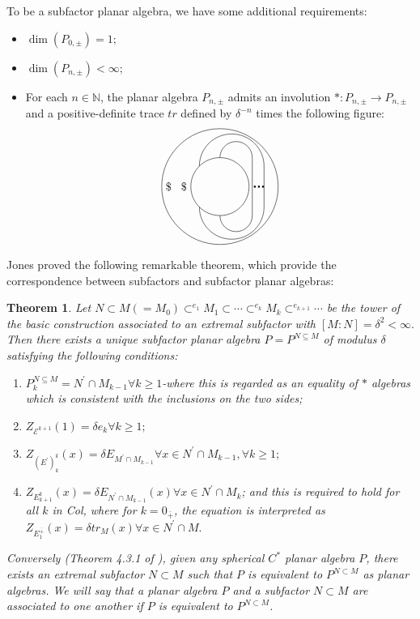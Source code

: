 \documentclass[11pt,letterpaper]{amsart}
\newtheorem{theorem}{Theorem}[section]
\theoremstyle{definition}
\theoremstyle{remark}
\def\ss{\subset}
\begin{document}
To be a subfactor planar algebra, we have some additional requirements:
\begin{itemize}
	\item $\dim(P_{0,\pm})=1;$
	\item $\dim(P_{n,\pm})<\infty$;
	\item For each $n\in\mathbb{N}$, the planar algebra $P_{n,\pm}$ admits an involution $*:P_{n,\pm}\rightarrow P_{n,\pm}$ and a positive-definite trace $tr$ defined by ${\delta}^{-n}$ times the following figure:
	\begin{equation*}
	\begin{tikzpicture}
	\draw (0,0) circle [radius=1.8];
	\draw (0,0) circle [radius=.9];
	\draw (-.707*.9,.707*.9) arc [radius=1, start angle=180, end angle=0];
	\draw (-.707*.9+2,.707*.9)--(-.707*.9+2,-.707*.9);
	\draw (-.707*.9,-.707*.9) arc [radius=1, start angle=-180, end angle=0];
	\draw (0,.9) arc [radius=.5, start angle=180, end angle=0];
	\draw (1,.9)--(1,-.9);
	\draw (0,-.9) arc [radius=.5, start angle=-180, end angle=0];
	\draw (1.05,0)--(2-.707*.9,0)[dotted, ultra thick];
	\node at (-.9,0) [left] {\$};
	\node at (-1.8,0) [right] {\$};
	\end{tikzpicture}
	\end{equation*}
\end{itemize}

Jones proved the following remarkable theorem, which provide the correspondence between subfactors and subfactor planar algebras:
\begin{theorem}\cite{Jo2} \label{jones}
 Let $N\ss M (=M_0){\ss}^{e_1} M_1 \ss \cdots {\ss}^{e_k} M_k {\ss}^{e_{k+1}}\cdots $
 be the tower of the basic construction associated to an extremal subfactor with $[M:N]= {\delta}^2<\infty.$
 Then there exists a unique subfactor planar algebra $P= P^{N\subseteq M}$ of modulus $\delta$ satisfying the following conditions:
 \begin{enumerate}
 \item $P^{N\subseteq M}_k= N^{\prime} \cap M_{k-1} \forall k\geq 1$-where this is regarded as an equality of $*$ algebras which is consistent with the inclusions on the  two sides;
 \item  $Z_{{\mathcal{E}}^{k+1}}(1)= \delta e_k \forall k\geq 1;$
 \item  $Z_{{(E^{\prime})}^k_k}(x)= \delta E_{M^{\prime}\cap M_{k-1}}\forall x\in N^{\prime}\cap M_{k-1}, \forall k\geq 1;$
  \item $Z_{E^k_{k+1}}(x)= \delta E_{N^{\prime}\cap M_{k-1}}(x) \forall x \in N^{\prime}\cap M_k$; and this is required to hold for all $k$ in Col, where for $k=0_{\bar{{+}}}$,
 the equation is interpreted as $Z_{E^{\bar{{+}}}_1}(x)= \delta tr_M(x) \forall x \in N^{\prime}\cap M.$
 \end{enumerate}
 Conversely (Theorem 4.3.1 of \cite{Jo2}), given any spherical $C^*$
planar algebra $P$, there exists an extremal subfactor
$N \ss M$ such that $P$ is equivalent to $P^{N\ss M}$ as planar algebras.
We will say that a planar algebra $P$ and a subfactor $N \ss M$ are
associated to one another if $P$ is equivalent to $P^{N\ss M}$.
\end{theorem}
\end{document}
